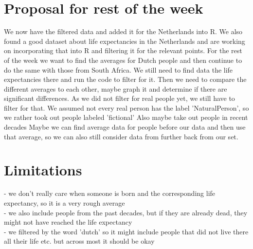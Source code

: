 \documentclass{article}
\begin{document}
\section{Proposal for rest of the week}
We now have the filtered data and added it for the Netherlands into R. We also found a good dataset about life expectancies in the Netherlands and are working on incorporating that into R and filtering it for the relevant points. For the rest of the week we want to find the averages for Dutch people and then continue to do the same with those from South Africa. We still need to find data the life expectancies there and run the code to filter for it. Then we need to compare the different averages to each other, maybe graph it and determine if there are significant differences. 
As we did not filter for real people yet, we still have to filter for that. We assumed not every real person has the label 'NaturalPerson', so we rather took out people labeled 'fictional'
Also maybe take out people in recent decades
Maybe we can find average data for people before our data and then use that average, so we can also still consider data from further back from our set. 

\section{Limitations}
- we don't really care when someone is born and the corresponding life expectancy, so it is a very rough average\\
- we also include people from the past decades, but if they are already dead, they might not have reached the life expectancy\\
- we filtered by the word 'dutch' so it might include people that did not live there all their life etc. but across most it should be okay\\
\end{document}

